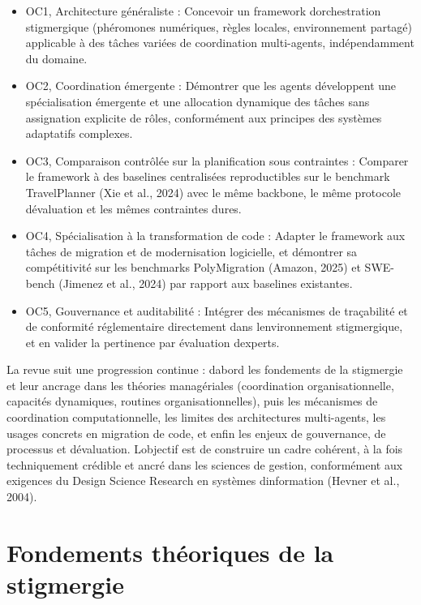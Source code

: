 \documentclass[12pt,a4paper]{article}
\providecommand{\tightlist}{%
  \setlength{\itemsep}{0pt}\setlength{\parskip}{0pt}}
\begin{document}
\begin{itemize}
\tightlist
\item
  OC1, Architecture généraliste : Concevoir un framework
  d\textquotesingle orchestration stigmergique (phéromones numériques,
  règles locales, environnement partagé) applicable à des tâches
  variées de coordination multi-agents, indépendamment du domaine.
\item
  OC2, Coordination émergente : Démontrer que les agents développent
  une spécialisation émergente et une allocation dynamique des tâches
  sans assignation explicite de rôles, conformément aux principes
  des systèmes adaptatifs complexes.
\item
  OC3, Comparaison contrôlée sur la planification sous contraintes :
  Comparer le framework à des baselines centralisées reproductibles sur
  le benchmark TravelPlanner (Xie et al., 2024) avec le même backbone,
  le même protocole d\textquotesingle évaluation et les mêmes
  contraintes dures.
\item
  OC4, Spécialisation à la transformation de code : Adapter le
  framework aux tâches de migration et de modernisation logicielle, et
  démontrer sa compétitivité sur les benchmarks PolyMigration (Amazon,
  2025) et SWE-bench (Jimenez et al., 2024) par rapport aux baselines
  existantes.
\item
  OC5, Gouvernance et auditabilité : Intégrer des mécanismes de
  traçabilité et de conformité réglementaire directement dans
  l\textquotesingle environnement stigmergique, et en valider la
  pertinence par évaluation d\textquotesingle experts.
\end{itemize}

La revue suit une progression continue : d\textquotesingle abord les
fondements de la stigmergie et leur ancrage dans les théories
managériales (coordination organisationnelle, capacités dynamiques,
routines organisationnelles), puis les mécanismes de coordination
computationnelle, les limites des architectures multi-agents, les usages
concrets en migration de code, et enfin les enjeux de gouvernance, de
processus et d\textquotesingle évaluation. L\textquotesingle objectif est
de construire un cadre cohérent, à la fois techniquement crédible et
ancré dans les sciences de gestion, conformément aux exigences du
Design Science Research en systèmes d\textquotesingle information
(Hevner et al., 2004).

\section{Fondements théoriques de la
stigmergie}\label{fondements-thuxe9oriques-de-la-stigmergie}
\end{document}
